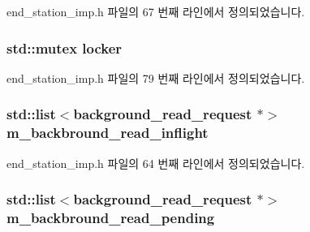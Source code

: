 end\+\_\+station\+\_\+imp.\+h 파일의 67 번째 라인에서 정의되었습니다.

\subsubsection[{\texorpdfstring{locker}{locker}}]{\setlength{\rightskip}{0pt plus 5cm}std\+::mutex locker}\hypertarget{classavdecc__lib_1_1end__station__imp_a2207f93fef130266b292686bf96ef8d3}{}\label{classavdecc__lib_1_1end__station__imp_a2207f93fef130266b292686bf96ef8d3}


end\+\_\+station\+\_\+imp.\+h 파일의 79 번째 라인에서 정의되었습니다.

\subsubsection[{\texorpdfstring{m\+\_\+backbround\+\_\+read\+\_\+inflight}{m_backbround_read_inflight}}]{\setlength{\rightskip}{0pt plus 5cm}std\+::list$<${\bf background\+\_\+read\+\_\+request} $\ast$$>$ m\+\_\+backbround\+\_\+read\+\_\+inflight\hspace{0.3cm}{\ttfamily [private]}}\hypertarget{classavdecc__lib_1_1end__station__imp_adc3620b385a00867b72dbfbcf6c839db}{}\label{classavdecc__lib_1_1end__station__imp_adc3620b385a00867b72dbfbcf6c839db}


end\+\_\+station\+\_\+imp.\+h 파일의 64 번째 라인에서 정의되었습니다.

\subsubsection[{\texorpdfstring{m\+\_\+backbround\+\_\+read\+\_\+pending}{m_backbround_read_pending}}]{\setlength{\rightskip}{0pt plus 5cm}std\+::list$<${\bf background\+\_\+read\+\_\+request} $\ast$$>$ m\+\_\+backbround\+\_\+read\+\_\+pending\hspace{0.3cm}{\ttfamily [private]}}\hypertarget{classavdecc__lib_1_1end__station__imp_af2ab09d6e9373db122f0646f7a9e1eb9}{}\label{classavdecc__lib_1_1end__station__imp_af2ab09d6e9373db122f0646f7a9e1eb9}


